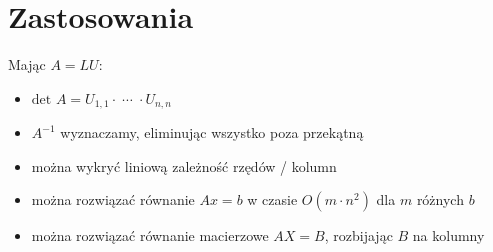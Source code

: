 \section{Zastosowania}
Mając \( A = LU \):
\begin{itemize}
\onehalfspacing
    \item \( \text{det }A = U_{1,1} \cdot \;\cdots\; \cdot U_{n,n} \)
    \item \( A^{-1} \) wyznaczamy, eliminując wszystko poza przekątną
    \item można wykryć liniową zależność rzędów / kolumn
    \item można rozwiązać równanie \( Ax = b \) w czasie \( O(m\cdot n^2) \) dla \( m \) różnych \(b \)
    \item można rozwiązać równanie macierzowe \( AX = B \), rozbijając \( B \) na kolumny
\end{itemize}